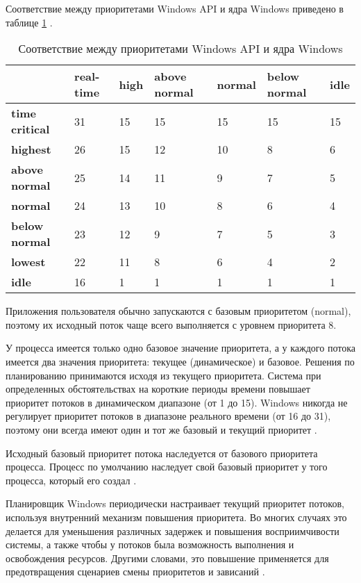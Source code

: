 Соответствие между приоритетами Windows API и ядра Windows приведено в таблице \ref{tbl:priority} \cite{win6}.
\begin{table}[h]
        \captionsetup{justification=raggedright,singlelinecheck=off}
	\caption{Соответствие между приоритетами Windows API и ядра Windows}
	\begin{center}
		\begin{tabular}{|l|p{45pt}|p{45pt}|p{45pt}|p{45pt}|p{45pt}|p{45pt}|} 
			\hline
			{} & \textbf{real-time} & \textbf{high} & \textbf{above normal} & \textbf{normal} & \textbf{below normal} & \textbf{idle}\\
			\hline
			\textbf{time critical} & 31 & 15 & 15 & 15 & 15 & 15 \\
			\hline
			\textbf{highest} & 26 & 15 & 12 & 10 & 8 & 6 \\
			\hline
			\textbf{above normal} & 25 & 14 & 11 & 9 & 7 & 5 \\
			\hline
			\textbf{normal} & 24 & 13 & 10 & 8 & 6 & 4 \\
			\hline
			\textbf{below normal} & 23 & 12 & 9 & 7 & 5 & 3 \\
			\hline
			\textbf{lowest} & 22 & 11 & 8 & 6 & 4 & 2 \\
			\hline
			\textbf{idle} & 16 & 1 & 1 & 1 & 1 & 1 \\
			\hline
		\end{tabular}
	\end{center}
	\label{tbl:priority}
\end{table}

Приложения пользователя обычно запускаются с базовым приоритетом ({\ttfamily normal}), поэтому их исходный поток чаще всего выполняется с уровнем приоритета 8. 

У процесса имеется только одно базовое значение приоритета, а у каждого потока имеется два значения приоритета: текущее (динамическое) и базовое. Решения по планированию принимаются исходя из текущего приоритета. Система при определенных обстоятельствах на короткие периоды времени повышает приоритет потоков в динамическом диапазоне (от 1 до 15). Windows никогда не регулирует приоритет потоков в диапазоне реального времени (от 16 до 31), поэтому они всегда имеют один и тот же базовый и текущий приоритет \cite{win6}.

Исходный базовый приоритет потока наследуется от базового приоритета процесса. Процесс по умолчанию наследует свой базовый приоритет у того процесса, который его создал \cite{win6}.

Планировщик Windows периодически настраивает текущий приоритет потоков, используя внутренний механизм повышения приоритета. Во многих случаях это делается для уменьшения различных задержек и повышения восприимчивости системы, а также чтобы у потоков была возможность выполнения и освобождения ресурсов. Другими словами, это повышение применяется для предотвращения
сценариев смены приоритетов и зависаний \cite{win7}. 


